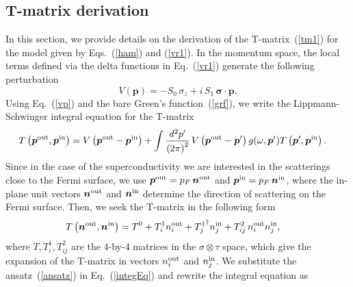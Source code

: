 \documentclass[twocolumn,showpacs,floatfix,longbibliography]{revtex4-1}
\begin{document}



\appendix



\begin{widetext}
\section{T-matrix derivation} \label{sec:appendixTMatrix}


In this section, we provide details on the derivation of the T-matrix~(\ref{tm1}) for the model given by Eqs.~(\ref{ham}) and (\ref{vr1}). In the momentum space, the local terms defined via the delta functions in Eq.~(\ref{vr1}) generate the following perturbation
\begin{equation}
	V(\bm p) = -S_0\,\sigma_z +  i \,S_1 \, \bm \sigma\cdot \bm  p.
	\label{vp}
\end{equation}
Using Eq.~(\ref{vp}) and the bare Green's function~(\ref{grf}), we write the Lippmann-Schwinger integral equation for the T-matrix
\begin{align}
	T\left(\bm p^{\rm out},\bm p^{\rm in}\right) &= V \left(\bm p^{\rm out}-\bm p^{\rm in}\right) +\int \frac{d^2 p'}{\left( 2\pi \right)^2}\, V\left(\bm p^{\rm out}-\bm p'\right) g(\omega,\bm p')  T\left(\bm p',\bm p^{\rm in}\right).
	\label{integEq}
\end{align}
Since in the case of the superconductivity we are interested in the scatterings close to the Fermi surface, we use $\bm p^{\rm out} = p_F\, \bm n^{\rm out}$ and $\bm p^{\rm in} = p_F \,\bm n^{\rm in}$, where the in-plane unit vectors $\bm n^{\rm out}$ and $\bm n^{\rm in}$ determine the direction of scattering on the Fermi surface.  Then, we seek the T-matrix in the following form
\begin{align}
	T\left(\bm n^{\rm out},\bm n^{\rm in}\right) &= T^0 + T^1_i n^{\rm out}_i + {T^1_j}^\dagger n^{\rm in}_j + T^2_{ij}\, n^{\rm out}_i n^{\rm in}_j, \label{ansatz}
\end{align}
where  $T,T^1_i,T^2_{ij}$ are the 4-by-4 matrices in the $\sigma\otimes\tau$ space, which give the expansion of the T-matrix in vectors $n^{\rm out}_i$ and $n^{\rm in}_j$. We substitute the ansatz~(\ref{ansatz}) in Eq.~(\ref{integEq}) and rewrite the integral equation as 

\end{widetext}
\end{document}
